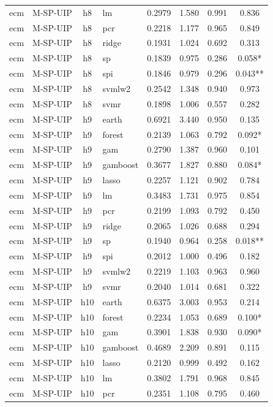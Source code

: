 \begin{ThreePartTable}
\begin{longtable}[t]{llclcccc}
ecm & M-SP-UIP & h8 & lm & 0.2979 & 1.580 & 0.991 & 0.836\\
ecm & M-SP-UIP & h8 & pcr & 0.2218 & 1.177 & 0.965 & 0.849\\
ecm & M-SP-UIP & h8 & ridge & 0.1931 & 1.024 & 0.692 & 0.313\\
ecm & M-SP-UIP & h8 & sp & 0.1839 & 0.975 & 0.286 & 0.058*\\
ecm & M-SP-UIP & h8 & spi & 0.1846 & 0.979 & 0.296 & 0.043**\\
ecm & M-SP-UIP & h8 & svmlw2 & 0.2542 & 1.348 & 0.940 & 0.973\\
ecm & M-SP-UIP & h8 & svmr & 0.1898 & 1.006 & 0.557 & 0.282\\
\addlinespace
ecm & M-SP-UIP & h9 & earth & 0.6921 & 3.440 & 0.950 & 0.135\\
ecm & M-SP-UIP & h9 & forest & 0.2139 & 1.063 & 0.792 & 0.092*\\
ecm & M-SP-UIP & h9 & gam & 0.2790 & 1.387 & 0.960 & 0.101\\
ecm & M-SP-UIP & h9 & gamboost & 0.3677 & 1.827 & 0.880 & 0.084*\\
ecm & M-SP-UIP & h9 & lasso & 0.2257 & 1.121 & 0.902 & 0.784\\
ecm & M-SP-UIP & h9 & lm & 0.3483 & 1.731 & 0.975 & 0.854\\
ecm & M-SP-UIP & h9 & pcr & 0.2199 & 1.093 & 0.792 & 0.450\\
ecm & M-SP-UIP & h9 & ridge & 0.2065 & 1.026 & 0.688 & 0.294\\
ecm & M-SP-UIP & h9 & sp & 0.1940 & 0.964 & 0.258 & 0.018**\\
ecm & M-SP-UIP & h9 & spi & 0.2012 & 1.000 & 0.496 & 0.182\\
ecm & M-SP-UIP & h9 & svmlw2 & 0.2219 & 1.103 & 0.963 & 0.960\\
ecm & M-SP-UIP & h9 & svmr & 0.2040 & 1.014 & 0.681 & 0.322\\
\addlinespace
ecm & M-SP-UIP & h10 & earth & 0.6375 & 3.003 & 0.953 & 0.214\\
ecm & M-SP-UIP & h10 & forest & 0.2234 & 1.053 & 0.689 & 0.100*\\
ecm & M-SP-UIP & h10 & gam & 0.3901 & 1.838 & 0.930 & 0.090*\\
ecm & M-SP-UIP & h10 & gamboost & 0.4689 & 2.209 & 0.891 & 0.115\\
ecm & M-SP-UIP & h10 & lasso & 0.2120 & 0.999 & 0.492 & 0.162\\
ecm & M-SP-UIP & h10 & lm & 0.3802 & 1.791 & 0.968 & 0.845\\
ecm & M-SP-UIP & h10 & pcr & 0.2351 & 1.108 & 0.795 & 0.460\\

\end{longtable}
\end{ThreePartTable}

